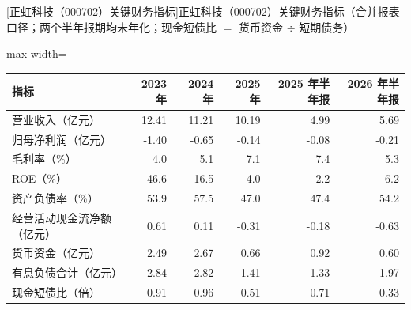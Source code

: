 \begin{center}\small\setlength{\tabcolsep}{3.4pt}
[正虹科技（000702）关键财务指标]{正虹科技（000702）关键财务指标（合并报表口径；两个半年报期均未年化；现金短债比 $=$ 货币资金 $\div$ 短期债务）}
\begin{adjustbox}{max width=\textwidth}
\begin{tabular}{@{}lrrrrr@{}}
\toprule
指标 & 2023 年 & 2024 年 & 2025 年 & 2025 年半年报 & 2026 年半年报 \\
\midrule
营业收入（亿元） & 12.41 & 11.21 & 10.19 & 4.99 & 5.69 \\
归母净利润（亿元） & -1.40 & -0.65 & -0.14 & -0.08 & -0.21 \\
毛利率（\%） & 4.0 & 5.1 & 7.1 & 7.4 & 5.3 \\
ROE（\%） & -46.6 & -16.5 & -4.0 & -2.2 & -6.2 \\
资产负债率（\%） & 53.9 & 57.5 & 47.0 & 47.4 & 54.2 \\
经营活动现金流净额（亿元） & 0.61 & 0.11 & -0.31 & -0.18 & -0.63 \\
货币资金（亿元） & 2.49 & 2.67 & 0.66 & 0.92 & 0.60 \\
有息负债合计（亿元） & 2.84 & 2.82 & 1.41 & 1.33 & 1.97 \\
现金短债比（倍） & 0.91 & 0.96 & 0.51 & 0.71 & 0.33 \\
\bottomrule
\end{tabular}
\end{adjustbox}
\end{center}

